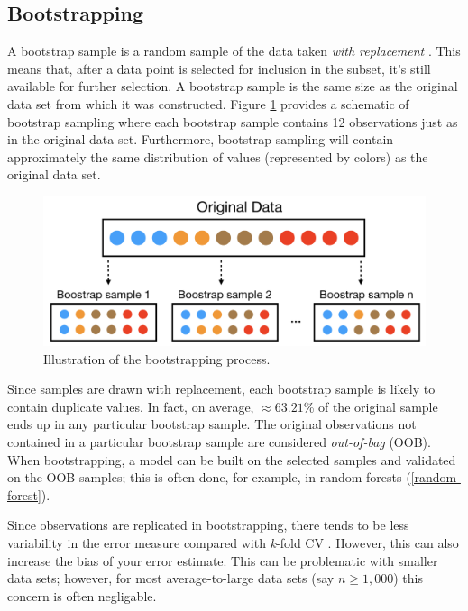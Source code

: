 \documentclass[]{krantz}
\begin{document}
\hypertarget{bootstrapping}{%
\subsection{Bootstrapping}\label{bootstrapping}}

A bootstrap sample is a random sample of the data taken \emph{with replacement} \citep{efron1986bootstrap}. This means that, after a data point is selected for inclusion in the subset, it's still available for further selection. A bootstrap sample is the same size as the original data set from which it was constructed. Figure \ref{fig:bootstrapscheme} provides a schematic of bootstrap sampling where each bootstrap sample contains 12 observations just as in the original data set. Furthermore, bootstrap sampling will contain approximately the same distribution of values (represented by colors) as the original data set.

\begin{figure}

{\centering \includegraphics[width=0.7\linewidth,height=0.7\textheight]{images/bootstrap-scheme} 

}

\caption{Illustration of the bootstrapping process.}\label{fig:bootstrapscheme}
\end{figure}

Since samples are drawn with replacement, each bootstrap sample is likely to contain duplicate values. In fact, on average, \(\approx 63.21\)\% of the original sample ends up in any particular bootstrap sample. The original observations not contained in a particular bootstrap sample are considered \emph{out-of-bag} (OOB). When bootstrapping, a model can be built on the selected samples and validated on the OOB samples; this is often done, for example, in random forests (\ref{random-forest}).

Since observations are replicated in bootstrapping, there tends to be less variability in the error measure compared with \emph{k}-fold CV \citep{efron1983estimating}. However, this can also increase the bias of your error estimate. This can be problematic with smaller data sets; however, for most average-to-large data sets (say \(n \geq 1,000\)) this concern is often negligable.
\end{document}
